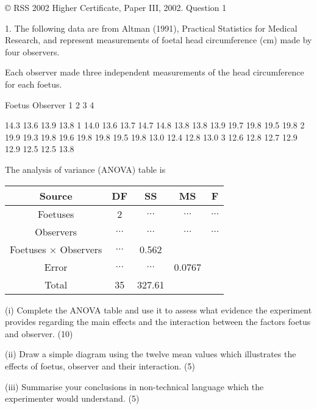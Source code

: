 \documentclass[a4paper,12pt]{article}
\begin{document}
© RSS 2002
Higher Certificate, Paper III, 2002. Question 1
\begin{framed}
1. The following data are from Altman (1991), Practical Statistics for Medical Research, and represent measurements of 
foetal head circumference (cm) made by four observers.  

Each observer made three independent measurements of the head circumference for each foetus. 
 
 
Foetus Observer       1 2 3 4       

14.3 13.6 13.9 13.8 1 14.0 13.6 13.7 14.7  14.8 13.8 13.8 13.9       
19.7 19.8 19.5 19.8 2 19.9 19.3 19.8 19.6  19.8 19.8 19.5 19.8       
13.0 12.4 12.8 13.0 3 12.6 12.8 12.7 12.9  12.9 12.5 12.5 13.8 
 
 
The analysis of variance (ANOVA) table is 
\begin{center}
\begin{tabular}{ccccc} 
Source	&	DF	&	SS	&	MS	&	F	\\ \hline 
Foetuses	&	2	&	$\ldots$	&	$\ldots$	&	$\ldots$	\\ \hline 
Observers	&	$\ldots$	&	$\ldots$	&	$\ldots$	&	$\ldots$	\\ \hline 
Foetuses × Observers	&	$\ldots$	&	0.562	&		&		\\ \hline 
Error	&	$\ldots$	&	$\ldots$	&	0.0767	&		\\ \hline 
Total	&	35	&	327.61	&		&		\\ \hline   
\end{tabular}
\end{center} 
 
(i) Complete the ANOVA table and use it to assess what evidence the experiment provides regarding the main effects 
and the interaction between the factors foetus and observer. (10) 
 
(ii) Draw a simple diagram using the twelve mean values which illustrates the effects of foetus, observer and their interaction. (5) 
 
(iii) Summarise your conclusions in non-technical language which the experimenter would understand. (5) 
 
\end{framed}
\end{document}

